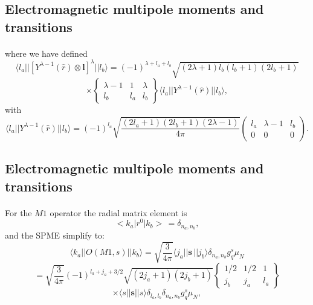 \documentclass[%
twoside,                 %
final,                   %
10pt]{article}
\begin{document}
\subsection*{Electromagnetic multipole moments and transitions}

\paragraph{}
where we have defined
\[
\langle l _{a}\vert\vert [Y^{\lambda -1}(\hat{r})\otimes\mathbf{l}]^{\lambda }\vert\vert l _{b}\rangle=(-1)^{\lambda +l _{a}+l _{b}} \sqrt{(2\lambda +1)l _{b}(l _{b}+1)(2l _{b}+1)}
\]
\[
\times\left\{\begin{array}{ccc}  {\lambda -1} & {1}&  {\lambda}\\   {l _{b}}&  {l _{a}} &  {l _{b}} \end{array}\right\}
\langle l _{a}\vert\vert Y^{\lambda -1}(\hat{r})\vert\vert l _{b}\rangle,
\]
with
\[
\langle l _{a}\vert\vert Y^{\lambda -1}(\hat{r})\vert\vert l _{b}\rangle=(-1)^{l _{a}} \sqrt{\frac{(2l _{a}+1)(2l _{b}+1)(2\lambda -1)}{4\pi }}\left(\begin{array}{ccc}  {l _{a}} & {\lambda -1} & {l _{b}}\\  {0} & {0}&  {0}\end{array}\right)
. 
\]



\subsection*{Electromagnetic multipole moments and transitions}

\paragraph{}
For the $M1$ operator the radial matrix element is
\[
<k_{a}\vert r^{0}\vert k_{b}>\, = \delta _{n_{a},n_{b}},
\]
and the SPME simplify to:
\[
\langle k_{a}\vert\vert O(M1,s)\vert\vert k_{b}\rangle=\sqrt{ \frac{3}{4\pi }}\langle j_{a}\vert\vert \mathbf{s}\,\vert\vert j_{b}\rangle \delta _{n_{a},n_{b}}g^{s}_{q}\mu_{N}
\]
\[
=\sqrt{ \frac{3}{4\pi }}(-1)^{l _{a}+j_{a}+3/2}
\sqrt{(2j_{a}+1)(2j_{b}+1)}\left\{\begin{array}{ccc}  {1/2}&  {1/2} & {1} \\ {j_{b}} & {j_{a}}&  {l _{a}}\end{array}\right\}
\]
\[
\times\langle s\vert\vert \mathbf{s}\vert\vert s\rangle \delta _{l _{a},l _{b}} \delta _{n_{a},n_{b}}g^{s}_{q}\mu _{N},
\]
\end{document}
